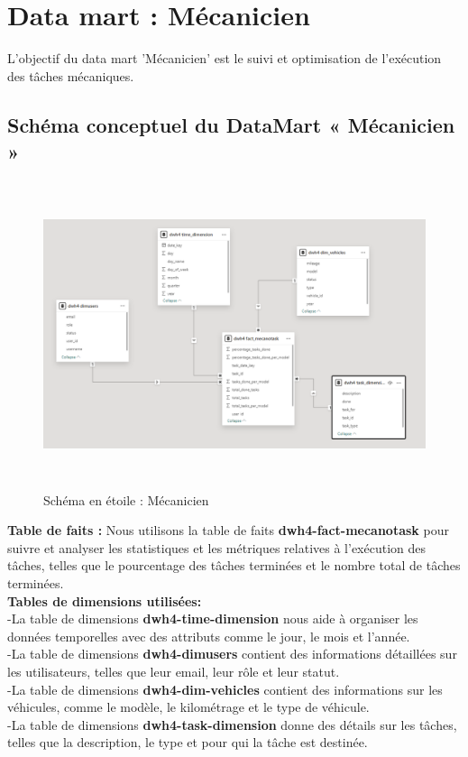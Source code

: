 



\newpage
\section{Data mart : Mécanicien}
L’objectif du data mart 'Mécanicien' est le suivi et optimisation de l'exécution des tâches mécaniques.
\subsection{ Schéma conceptuel du DataMart « Mécanicien »}
\begin{figure}[h!]

    \centering
    \includegraphics[width=1\textwidth, height=9cm]{chap6.images/mart mecano.png}
    \caption{ Schéma en étoile : Mécanicien}

\end{figure}
\noindent
\textbf{Table de faits :} Nous utilisons la table de faits \textbf{dwh4-fact-mecanotask} pour suivre et analyser les statistiques et les métriques relatives à l'exécution des tâches, telles que le pourcentage des tâches terminées et le nombre total de tâches terminées.\\

\noindent
\textbf{Tables de dimensions utilisées:}\\
-La table de dimensions \textbf{dwh4-time-dimension} nous aide à organiser les données temporelles avec des attributs comme le jour, le mois et l'année.\\
-La table de dimensions \textbf{dwh4-dimusers} contient des informations détaillées sur les utilisateurs, telles que leur email, leur rôle et leur statut.\\
-La table de dimensions \textbf{dwh4-dim-vehicles} contient des informations sur les véhicules, comme le modèle, le kilométrage et le type de véhicule.\\
-La table de dimensions \textbf{dwh4-task-dimension} donne des détails sur les tâches, telles que la description, le type et pour qui la tâche est destinée.\\

